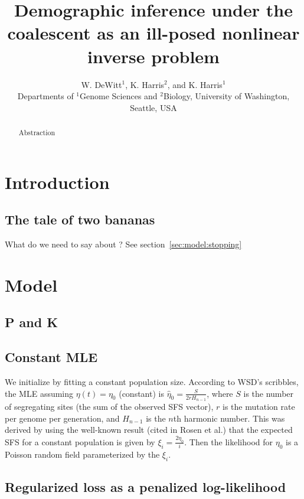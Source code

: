 \documentclass[11pt]{article}
\title{Demographic inference under the coalescent as an ill-posed nonlinear inverse problem}
\author{
W. DeWitt$^{1}$, K. Harris$^{2}$, and K. Harris$^{1}$\\
\small{Departments of $^1$Genome Sciences and $^2$Biology, University of Washington, Seattle, USA}\\
}
\begin{document}
\maketitle

\begin{abstract}
Abstraction
\end{abstract}

\section*{Introduction}\label{sec:intro}


\subsection*{The tale of two bananas}\label{sec:intro:bananas}

What do we need to say about \cite{Rosen2018-bb}? See section~\ref{sec:model:stopping}


\section*{Model}\label{sec:model}

\subsection*{P and K}\label{sec:model:PandK}

\cite{Polanski2003-ll}


\subsection*{Constant MLE}\label{sec:model:constant}

We initialize by fitting a constant population size.
According to WSD's scribbles, the MLE assuming $\eta(t) = \eta_0$ (constant) is $\hat \eta_0 = \frac{S}{2 r H_{n-1}}$, where $S$ is the number of segregating sites (the sum of the observed SFS vector), $r$ is the mutation rate per genome per generation, and $H_{n-1}$ is the $n$th harmonic number.
This was derived by using the well-known result (cited in Rosen et al.) that the expected SFS for a constant population is given by $\xi_i = \frac{2\eta_0}{i}$.
Then the likelihood for $\eta_0$ is a Poisson random field parameterized by the $\xi_i$.


\subsection*{Regularized loss as a penalized log-likelihood}\label{sec:model:penalization}
\end{document}
